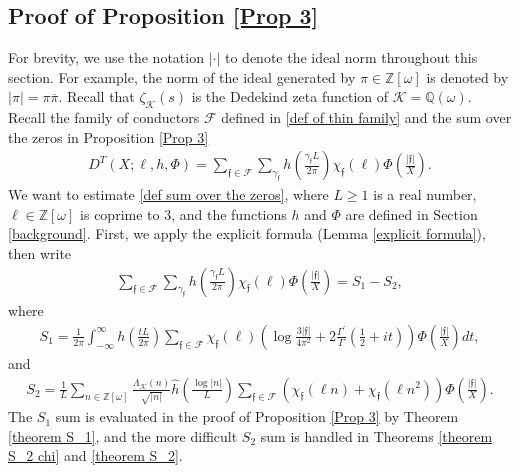 \documentclass[11pt]{amsart}
\numberwithin{equation}{section}
\theoremstyle{remark}
\begin{document}
\subsection{Proof of Proposition \ref{Prop 3}}\label{Proof of prop 3}
For brevity, we use the notation $|\cdot|$ to denote the ideal norm throughout this section. For example, the norm of the ideal generated by $\pi\in \mathbb{Z}[\omega]$ is denoted by $|\pi|=\pi\overline{\pi}$. Recall that $\zeta_\mathcal{K}(s)$ is the Dedekind zeta function of $\mathcal{K}=\mathbb{Q}(\omega).$
Recall the family of conductors $\mathcal{F}$ defined in \eqref{def of thin family} and the sum over the zeros in Proposition \ref{Prop 3}
\begin{align}
\label{def sum over the zeros}
    D^T(X; \ell, h, \Phi)=\sum_{\mathfrak{f}\in\mathcal{F}} \sum_{\gamma_{\mathfrak{f}}} h\left( \frac{\gamma_{\mathfrak{f}} L}{2\pi}\right)\chi_\mathfrak{f}(\ell) \Phi\left(\frac{|\mathfrak{f}|}{X}\right).
\end{align}
We want to estimate \eqref{def sum over the zeros}, where $L\ge1$ is a real number, $\ell\in \mathbb{Z}[\omega]$ is coprime to 3, and the functions $h$ and $\Phi$ are defined in Section \ref{background}. First, we apply the explicit formula (Lemma \ref{explicit formula}), then write 
\begin{align*}
    \sum_{\mathfrak{f}\in\mathcal{F}} \sum_{\gamma_{\mathfrak{f}}} h\left( \frac{\gamma_{\mathfrak{f}} L}{2\pi}\right)\chi_\mathfrak{f}(\ell) \Phi\left(\frac{|\mathfrak{f}|}{X}\right)
    =S_1-S_2,
\end{align*}
where
\begin{align*}
	S_1
	=
	\frac{1}{2\pi} \int_{-\infty}^\infty h\left(\frac{tL}{2\pi}\right)\sum_{\mathfrak{f}\in \mathcal{F}}\chi_\mathfrak{f}(\ell)\left(\log \frac{3|\mathfrak{f}|}{4\pi^2} + 2\frac{\Gamma^\prime}{\Gamma}\left(\frac{1}{2}+it\right)\right)\Phi\left(\frac{|\mathfrak{f}|}{X}\right)dt,
\end{align*}
and
\begin{align}\label{eq. S_2 sum}
	S_2
	=
	\frac{1}{L}\sum_{n \in \mathbb{Z}[\omega]} \frac{\Lambda_\mathcal{K}(n)}{\sqrt{|n|}}\hat{h}\left(\frac{\log |n|}{L}\right)\sum_{\mathfrak{f}\in \mathcal{F}}(\chi_\mathfrak{f}(\ell n)+\chi_\mathfrak{f}(\ell n^2)) \Phi\left(\frac{|\mathfrak{f}|}{X}\right).
\end{align}
The $S_1$ sum
is evaluated in the proof of Proposition \ref{Prop 3} by Theorem \ref{theorem S_1}, and the more difficult $S_2$ sum is handled in Theorems \ref{theorem S_2 chi} and \ref{theorem S_2}.
\end{document}
